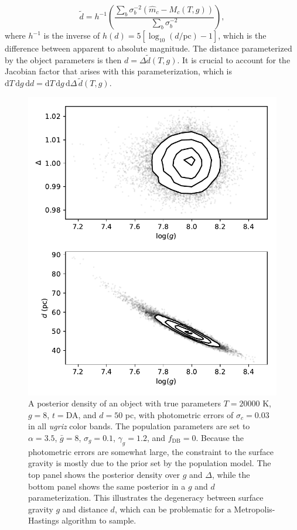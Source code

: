 \documentclass[fleqn,usenatbib]{mnras}
\newcommand{\Teff}{T}
\newcommand{\logg}{g}
\newcommand{\de}{\text{d}}
\begin{document}
\begin{equation}
	\tilde{d} = 
    h^{-1}\left( \frac{\sum_b \sigma_b^{-2} (\hat{m}_c-M_c(\Teff,\logg))}{\sum_b \sigma_b^{-2}} \right),
\end{equation}
where $h^{-1}$ is the inverse of $h(d)=5[\log_{10}(d/\text{pc})-1]$, which is the difference between apparent to absolute magnitude. The distance parameterized by the object parameters is then $d=\Delta\tilde{d}(\Teff,\logg)$. It is crucial to account for the Jacobian factor that arises with this parameterization, which is $\de \Teff\, \de \logg\, \de d = \de \Teff\, \de \logg\, \de \Delta\, \tilde{d}(\Teff,\logg)$.

\begin{figure}
	\includegraphics[width=\columnwidth]{banana.pdf}
    \caption{A posterior density of an object with true parameters $\Teff=20000$ K, $\logg=8$, $t=$DA, and $d=50$ pc, with photometric errors of $\sigma_c=0.03$ in all \emph{ugriz} color bands. The population parameters are set to $\alpha=3.5$, $\bar{g}=8$, $\sigma_g=0.1$, $\gamma_g=1.2$, and $f_\text{DB}=0$. Because the photometric errors are somewhat large, the constraint to the surface gravity is mostly due to the prior set by the population model. The top panel shows the posterior density over $\logg$ and $\Delta$, while the bottom panel shows the same posterior in a $\logg$ and $d$ parameterization. This illustrates the degeneracy between surface gravity $\logg$ and distance $d$, which can be problematic for a Metropolis-Hastings algorithm to sample.}
    \label{fig:banana}
\end{figure}
\end{document}
